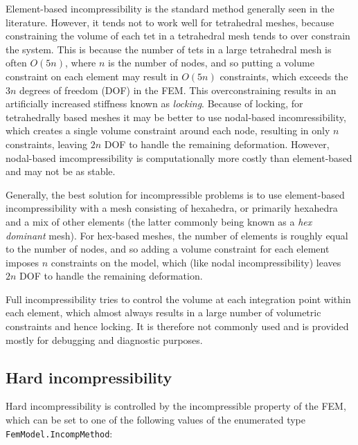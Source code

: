 Element-based incompressibility is the standard method generally seen
in the literature. However, it tends not to work well for
tetrahedral meshes, because constraining the volume of each tet in a
tetrahedral mesh tends to over constrain the system. This is because
the number of tets in a large tetrahedral mesh is often $O(5 n)$,
where $n$ is the number of nodes, and so putting a volume constraint
on each element may result in $O(5 n)$ constraints, which exceeds the
$3 n$ degrees of freedom (DOF) in the FEM. This overconstraining results in an
artificially increased stiffness known as \emph{locking}. Because of
locking, for tetrahedrally based meshes it may be better to use
nodal-based incomressibility, which creates a single volume constraint
around each node, resulting in only $n$ constraints, leaving $2 n$ DOF
to handle the remaining deformation.  However, nodal-based
imcompressibility is computationally more costly than element-based
and may not be as stable.

Generally, the best solution for incompressible problems is to use
element-based incompressibility with a mesh consisting of hexahedra,
or primarily hexahedra and a mix of other elements (the latter
commonly being known as a \emph{hex dominant} mesh). For hex-based
meshes, the number of elements is roughly equal to the number of
nodes, and so adding a volume constraint for each element imposes $n$
constraints on the model, which (like nodal incompressibility)
leaves $2 n$ DOF to handle the remaining deformation.

Full incompressibility tries to control the volume at each
integration point within each element, which almost always results in
a large number of volumetric constraints and hence locking. It is
therefore not commonly used and is provided mostly for debugging and
diagnostic purposes.

\subsection{Hard incompressibility}
\label{HardIncomp:sec}

Hard incompressibility is controlled by the {\sf incompressible}
property of the FEM, which can be set to one of the following values
of the enumerated type {\tt FemModel.IncompMethod}:


